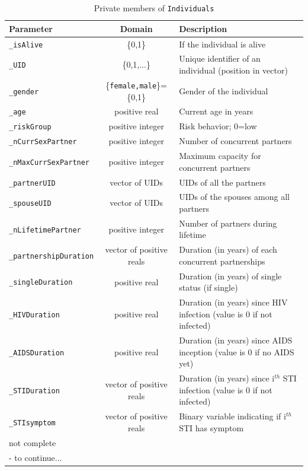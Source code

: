 \documentclass[11pt, onecolumn]{article}
\newcommand{\ttt}[1]{\texttt{#1}}
\begin{document}
\begin{table}[htdp]

\begin{footnotesize}
\begin{center}
\begin{tabular}{|l|c|l|}
\hline
Parameter  & Domain & Description\\
\hline 

\ttt{\_isAlive} & \{0,1\} & If the individual is alive \\
\ttt{\_UID} & \{0,1,...\} & Unique identifier of an individual (position in vector)\\
\ttt{\_gender} & \{\ttt{female,male}\}=\{0,1\} &  Gender of the individual \\
\ttt{\_age} & positive real &  Current age in years \\
\ttt{\_riskGroup} & positive integer & Risk behavior; 0=low \\
\ttt{\_nCurrSexPartner} &  positive integer & Number of concurrent partners \\
\ttt{\_nMaxCurrSexPartner} &  positive integer & Maximum capacity for concurrent partners \\
\ttt{\_partnerUID} &  vector of UIDs & UIDs of all the partners \\
\ttt{\_spouseUID} &  vector of UIDs & UIDs of the spouses among all partners \\
\ttt{\_nLifetimePartner} &  positive integer & Number of partners during lifetime \\
\ttt{\_partnershipDuration} &  vector of positive reals & Duration (in years) of each concurrent partnerships\\
\ttt{\_singleDuration} &  positive real & Duration (in years) of single status (if single)\\
\ttt{\_HIVDuration} &  positive real & Duration (in years) since HIV infection (value is 0 if not infected)\\
\ttt{\_AIDSDuration} &  positive real & Duration (in years) since AIDS inception (value is 0 if no AIDS yet)\\
\ttt{\_STIDuration} &  vector of positive reals & Duration (in years) since i$^{th}$ STI infection (value is 0 if not infected)\\
\ttt{\_STIsymptom} &  vector of positive reals & Binary variable indicating if i$^{th}$ STI has symptom\\
not complete \\ - to continue... & & \\

\hline
\end{tabular}
\caption{Private members of \ttt{Individuals}}
\label{tab:individualClass}
\end{center}
\end{footnotesize}
\end{table}
\end{document}

